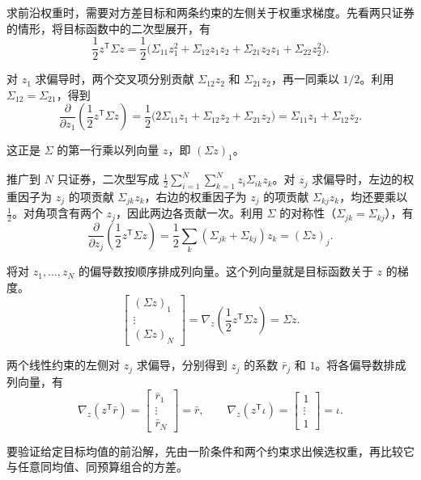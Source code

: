 \hypertarget{wj-12-frontier-gradient}{}求前沿权重时，需要对方差目标和两条约束的左侧关于权重求梯度。先看两只证券的情形，将目标函数中的二次型展开，有
\[
 \frac12 z^{\mathsf T}\Sigma z
 =\frac12\bigl(\Sigma_{11}z_1^2+\Sigma_{12}z_1z_2
              +\Sigma_{21}z_2z_1+\Sigma_{22}z_2^2\bigr).
\]

对 $z_1$ 求偏导时，两个交叉项分别贡献 $\Sigma_{12}z_2$ 和 $\Sigma_{21}z_2$，再一同乘以 $1/2$。利用 $\Sigma_{12}=\Sigma_{21}$，得到
\[
 \frac{\partial}{\partial z_1}\!\left(\frac12 z^{\mathsf T}\Sigma z\right)
 =\frac12\bigl(2\Sigma_{11}z_1+\Sigma_{12}z_2+\Sigma_{21}z_2\bigr)
 =\Sigma_{11}z_1+\Sigma_{12}z_2.
\]

这正是 $\Sigma$ 的第一行乘以列向量 $z$，即 $(\Sigma z)_1$。

推广到 $N$ 只证券，二次型写成 $\tfrac12\sum_{i=1}^N\sum_{k=1}^N z_i\Sigma_{ik}z_k$。对 $z_j$ 求偏导时，左边的权重因子为 $z_j$ 的项贡献 $\Sigma_{jk}z_k$，右边的权重因子为 $z_j$ 的项贡献 $\Sigma_{kj}z_k$，均还要乘以 $\tfrac12$。对角项含有两个 $z_j$，因此两边各贡献一次。利用 $\Sigma$ 的对称性（$\Sigma_{jk}=\Sigma_{kj}$），有
\[
 \frac{\partial}{\partial z_j}\!\left(\frac12 z^{\mathsf T}\Sigma z\right)
 =\frac12\sum_k(\Sigma_{jk}+\Sigma_{kj})z_k=(\Sigma z)_j.
\]

将对 $z_1,\ldots,z_N$ 的偏导数按顺序排成列向量。这个列向量就是目标函数关于 $z$ 的梯度。
\[
 \begin{bmatrix}(\Sigma z)_1\\ \vdots\\ (\Sigma z)_N\end{bmatrix}
 =\nabla_z\!\left(\frac12 z^{\mathsf T}\Sigma z\right)
 =\Sigma z.
\]

两个线性约束的左侧对 $z_j$ 求偏导，分别得到 $z_j$ 的系数 $\bar r_j$ 和 $1$。将各偏导数排成列向量，有
\[
 \nabla_z(z^{\mathsf T}\bar r)
 =\begin{bmatrix}\bar r_1\\ \vdots\\ \bar r_N\end{bmatrix}=\bar r,
 \qquad
 \nabla_z(z^{\mathsf T}\iota)
 =\begin{bmatrix}1\\ \vdots\\ 1\end{bmatrix}=\iota.
\]

要验证给定目标均值的前沿解，先由一阶条件和两个约束求出候选权重，再比较它与任意同均值、同预算组合的方差。

